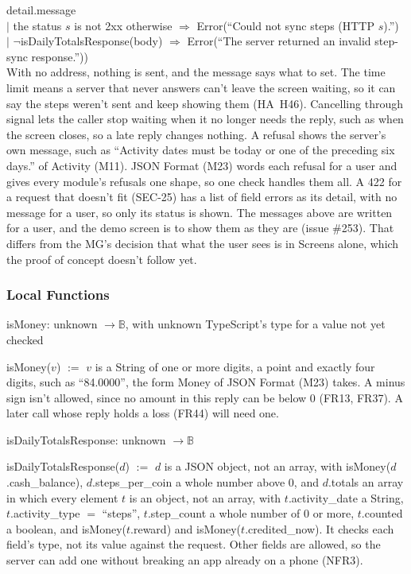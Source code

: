 \documentclass[12pt, titlepage]{article}
\begin{document}
\begin{itemize}
  detail.message\\
  \hspace*{1em}$|$ the status $s$ is not 2xx otherwise $\Rightarrow$
  Error(``Could not sync steps (HTTP $s$).'')\\
  \hspace*{1em}$|$ $\neg$isDailyTotalsResponse(body) $\Rightarrow$
  Error(``The server returned an invalid step-sync response.''))\\
  With no address, nothing is sent, and the message says what to set. The
  time limit means a server that never answers can't leave the screen
  waiting, so it can say the steps weren't sent and keep showing them
  (HA~H46). Cancelling through signal lets the caller stop waiting when it no
  longer needs the reply, such as when the screen closes, so a late reply
  changes nothing. A refusal shows the server's own message, such as
  ``Activity dates must be today or one of the preceding six days.'' of
  Activity (M11). JSON Format (M23) words each refusal for a
  user and gives every module's refusals one shape, so one check handles them
  all. A 422 for a request that doesn't fit (SEC-25) has a list of field
  errors as its detail, with no message for a user, so only its status is
  shown. The messages above are written for a user, and the demo screen is to
  show them as they are (issue \#253). That differs from the MG's decision that
  what the user sees is in Screens alone, which the proof of concept doesn't
  follow yet.
\end{itemize}

\subsubsection{Local Functions}

\noindent isMoney: unknown $\rightarrow \mathbb{B}$, with unknown TypeScript's
type for a value not yet checked

\noindent isMoney($v$) $:=$ $v$ is a String of one or more digits, a point and
exactly four digits, such as ``84.0000'', the form Money of JSON Format (M23)
takes. A minus sign isn't allowed, since no amount in this reply can be below 0
(FR13, FR37). A later call whose reply holds a loss (FR44) will need one.

\medskip
\noindent isDailyTotalsResponse: unknown $\rightarrow \mathbb{B}$

{\raggedright
\noindent isDailyTotalsResponse($d$) $:=$ $d$ is a JSON object, not an array,
with isMoney($d$.cash\_balance), $d$.steps\_per\_coin a whole number above 0,
and $d$.totals an array in which every element $t$ is an object, not an array,
with $t$.activity\_date a String, $t$.activity\_type $=$ ``steps'',
$t$.step\_count a whole number of 0 or more, $t$.counted a boolean, and
isMoney($t$.reward) and isMoney($t$.credited\_now). It checks each field's
type, not its value against the request. Other fields are allowed, so the
server can add one without breaking an app already on a phone (NFR3).\par}
\end{document}

